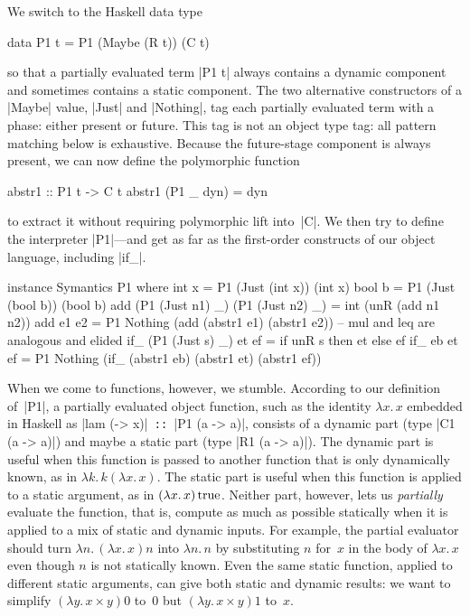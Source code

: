 \documentclass[preprint]{sigplanconf}
\newcommand{\fun}[1]{\mathopen{\lambda\mathord{#1}.\,}}
\newcommand{\True}{\mathinner{\mathrm{true}}}
\begin{document}
We switch to the Haskell data type
\begin{code}
data P1 t = P1 (Maybe (R t)) (C t)
\end{code}
so that a partially evaluated term |P1 t| always contains a dynamic
component and sometimes contains a static component.  The two
alternative constructors of a |Maybe| value, |Just| and |Nothing|,
tag each partially evaluated term with a phase: either present or
future.  This tag is not an object type tag: all pattern matching below
is exhaustive.  Because the future-stage component is always present, we
can now define the polymorphic function
\begin{code}
abstr1 :: P1 t -> C t
abstr1 (P1 _ dyn) = dyn
\end{code}
to extract it without requiring polymorphic lift into~|C|.  We then try
to define the interpreter |P1|---and get as far as the first-order
constructs of our object language, including |if_|.
\begin{code}
instance Symantics P1 where
  int  x = P1 (Just (int x)) (int x)
  bool b = P1 (Just (bool b)) (bool b)
  add (P1 (Just n1) _) (P1 (Just n2) _)
    = int (unR (add n1 n2))
  add e1 e2 = P1 Nothing
    (add (abstr1 e1) (abstr1 e2))
  -- mul and leq are analogous and elided
  if_ (P1 (Just s) _) et ef
    = if unR s then et else ef
  if_ eb et ef = P1 Nothing
    (if_ (abstr1 eb) (abstr1 et) (abstr1 ef))
\end{code}

When we come to functions, however, we stumble.  According to our
definition of~|P1|, a partially evaluated object function, such as the
identity $\fun{x}x$ embedded in Haskell as |lam (\x -> x)|\texttt{ ::
}|P1 (a -> a)|, consists of a dynamic part (type |C1 (a -> a)|) and
maybe a static part (type |R1 (a -> a)|).  The dynamic part is useful
when this function is passed to another function that is only
dynamically known, as in $\fun{k}k(\fun{x}x)$.  The static part is
useful when this function is applied to a static argument, as in
$(\fun{x}x)\True$.  Neither part, however, lets us \emph{partially}
evaluate the function, that is, compute as much as possible statically
when it is applied to a mix of static and dynamic inputs.  For example,
the partial evaluator should turn $\fun{n}(\fun{x}x)n$ into $\fun{n}n$
by substituting $n$ for~$x$ in the body of $\fun{x}x$ even though $n$ is
not statically known.  Even the same static function, applied to
different static arguments, can give both static and dynamic results: we
want to simplify $(\fun{y}x\times y)0$ to~$0$ but $(\fun{y}x\times y)1$
to~$x$.
\end{document}
